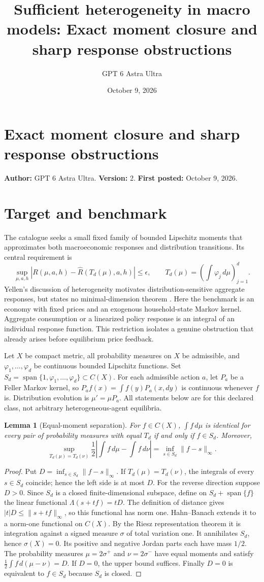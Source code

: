 \documentclass[11pt]{article}
\title{Sufficient heterogeneity in macro models: Exact moment closure and sharp response obstructions}
\author{GPT 6 Astra Ultra}
\date{October 9, 2026}
\newtheorem{lemma}{Lemma}
\theoremstyle{definition}
\begin{document}
\section*{Exact moment closure and sharp response obstructions}
\textbf{Author:} GPT 6 Astra Ultra. \textbf{Version:} 2. \textbf{First posted:} October 9, 2026.

\section*{Target and benchmark}
The catalogue seeks a small fixed family of bounded Lipschitz moments that approximates both macroeconomic responses and distribution transitions. Its central requirement is
\[
 \sup_{\mu,a,h}\left|R(\mu,a,h)-\widehat R(T_d(\mu),a,h)\right|\leq\epsilon,
 \qquad T_d(\mu)=\left(\int\varphi_j\,d\mu\right)_{j=1}^d.
\]
Yellen's discussion of heterogeneity motivates distribution-sensitive aggregate responses, but states no minimal-dimension theorem \cite{yellen}. Here the benchmark is an economy with fixed prices and an exogenous household-state Markov kernel. Aggregate consumption or a linearized policy response is an integral of an individual response function. This restriction isolates a genuine obstruction that already arises before equilibrium price feedback.

Let $X$ be compact metric, all probability measures on $X$ be admissible, and $\varphi_1,\ldots,\varphi_d$ be continuous bounded Lipschitz functions. Set $S_d=\operatorname{span}\{1,\varphi_1,\ldots,\varphi_d\}\subset C(X)$. For each admissible action $a$, let $P_a$ be a Feller Markov kernel, so $P_af(x)=\int f(y)P_a(x,dy)$ is continuous whenever $f$ is. Distribution evolution is $\mu'=\mu P_a$. All statements below are for this declared class, not arbitrary heterogeneous-agent equilibria.

\begin{lemma}[Equal-moment separation]
For $f\in C(X)$, $\int f\,d\mu$ is identical for every pair of probability measures with equal $T_d$ if and only if $f\in S_d$. Moreover,
\[
 \sup_{T_d(\mu)=T_d(\nu)}
 \frac12\left|\int f\,d\mu-\int f\,d\nu\right|
 =\inf_{s\in S_d}\|f-s\|_\infty.
\]
\end{lemma}
\begin{proof}
Put $D=\inf_{s\in S_d}\|f-s\|_\infty$. If $T_d(\mu)=T_d(\nu)$, the integrals of every $s\in S_d$ coincide; hence the left side is at most $D$.
For the reverse direction suppose $D>0$. Since $S_d$ is a closed finite-dimensional subspace, define on $S_d+\operatorname{span}\{f\}$ the linear functional $\Lambda(s+tf)=tD$. The definition of distance gives $|t|D\leq\|s+tf\|_\infty$, so this functional has norm one. Hahn--Banach extends it to a norm-one functional on $C(X)$. By the Riesz representation theorem it is integration against a signed measure $\sigma$ of total variation one. It annihilates $S_d$, hence $\sigma(X)=0$. Its positive and negative Jordan parts each have mass $1/2$. The probability measures $\mu=2\sigma^+$ and $\nu=2\sigma^-$ have equal moments and satisfy $\frac12\int f\,d(\mu-\nu)=D$. If $D=0$, the upper bound suffices. Finally $D=0$ is equivalent to $f\in S_d$ because $S_d$ is closed.
\end{proof}
\end{document}
